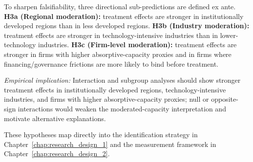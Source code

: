 To sharpen falsifiability, three directional sub-predictions are defined ex ante. \textbf{H3a (Regional moderation):} treatment effects are stronger in institutionally developed regions than in less developed regions. \textbf{H3b (Industry moderation):} treatment effects are stronger in technology-intensive industries than in lower-technology industries. \textbf{H3c (Firm-level moderation):} treatment effects are stronger in firms with higher absorptive-capacity proxies and in firms where financing/governance frictions are more likely to bind before treatment.

\emph{Empirical implication:} Interaction and subgroup analyses should show stronger treatment effects in institutionally developed regions, technology-intensive industries, and firms with higher absorptive-capacity proxies; null or opposite-sign interactions would weaken the moderated-capacity interpretation and motivate alternative explanations.

These hypotheses map directly into the identification strategy in Chapter~\ref{chap:research_design_1} and the measurement framework in Chapter~\ref{chap:research_design_2}.
